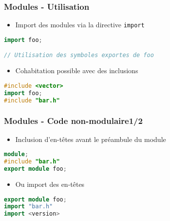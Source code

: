 \documentclass[C++.tex]{subfiles}
\begin{document}
\begin{frame}[fragile]
	\frametitle{Modules - Utilisation}
	\begin{itemize}
		\item Import des modules via la directive \lstinline|import|
	\end{itemize}

	\begin{lstlisting}[language=C++]
import foo;

// Utilisation des symboles exportes de foo\end{lstlisting}

	\begin{itemize}
		\item Cohabitation possible avec des inclusions
	\end{itemize}

	\begin{lstlisting}[language=C++]
#include <vector>
import foo;
#include "bar.h"\end{lstlisting}
\end{frame}

\begin{frame}[fragile]
	\frametitle{Modules - Code non-modulaire\titlehfill{}1/2}
	\begin{itemize}
		\item Inclusion d'en-têtes avant le préambule du module
	\end{itemize}


	\begin{lstlisting}[language=C++]
module;
#include "bar.h"
export module foo;\end{lstlisting}
	
	\begin{itemize}
		\item Ou import des en-têtes
	\end{itemize}


	\begin{lstlisting}[language=C++]
export module foo;
import "bar.h"
import <version>\end{lstlisting}
\end{frame}
\end{document}
